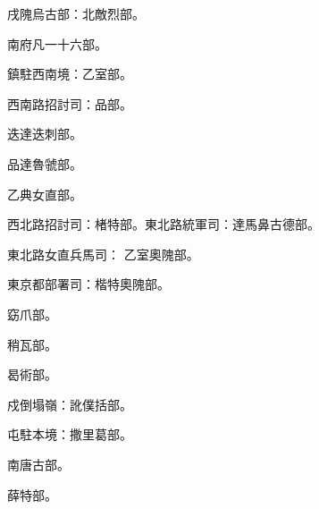 \begin{pinyinscope}
 戌隗烏古部：北敵烈部。



 南府凡一十六部。



 鎮駐西南境：乙室部。



 西南路招討司：品部。



 迭達迭刺部。



 品達魯虢部。



 乙典女直部。



 西北路招討司：楮特部。東北路統軍司：達馬鼻古德部。



 東北路女直兵馬司：
 乙室奧隗部。



 東京都部署司：楷特奧隗部。



 窈爪部。



 稍瓦部。



 曷術部。



 戍倒塌嶺：訛僕括部。



 屯駐本境：撒里葛部。



 南唐古部。



 薛特部。



\end{pinyinscope}